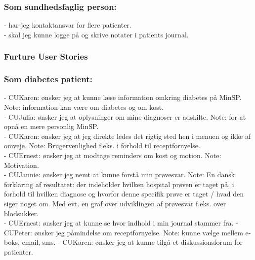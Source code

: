 \subsubsection*{Som sundhedsfaglig person:}
- har jeg kontaktansvar for flere patienter.\\
- skal jeg kunne logge på og skrive notater i patients journal.\\
\subsubsection{\textbf{Furture User Stories}}
\subsubsection*{Som diabetes patient:}
- CUKaren: ønsker jeg at kunne læse information omkring diabetes på MinSP. Note: information kan være om diabetes og om kost.\\
- CUJulia: ønsker jeg at oplysninger om mine diagnoser er adskilte. Note: for at opnå en mere personlig MinSP.\\
- CUKaren: ønsker jeg at jeg direkte ledes det rigtig sted hen i menuen og ikke af omveje. Note: Brugervenlighed f.eks. i forhold til receptfornyelse.\\ 
- CUErnest: ønsker jeg at modtage reminders om kost og motion. Note: Motivation. \\
- CUJannie: ønsker jeg nemt at kunne forstå min prøvesvar. Note: En dansk forklaring af resultatet: der indeholder hvilken hospital prøven er taget på, i forhold til hvilken diagnose og hvorfor denne specifik prøve er taget / hvad den siger noget om. Med evt. en graf over udviklingen af prøvesvar f.eks. over blodsukker.\\
- CUErnest: ønsker jeg at kunne se hvor indhold i min journal stammer fra.
- CUPeter: ønsker jeg påmindelse om receptfornyelse. Note: kunne vælge mellem e-boks, email, sms.
- CUKaren: ønsker jeg at kunne tilgå et diskussionsforum for patienter.\\
%
